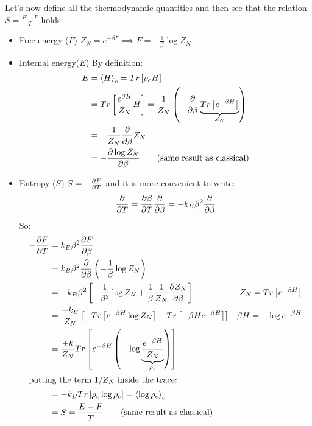 Let's now define all the thermodynamic quantities and then see that the relation $S = \frac{E-F}T$ holds:
\begin{itemize}
    \item Free energy ($F$) \qquad $ Z_N = e^{-\beta F} \implies F = -\frac1\beta \log Z_N$
    \item Internal energy($E$) \qquad By definition:
    \begin{align*}
        E &= \left<H\right>_c = Tr\left[\rho_c H\right] \\
        &= Tr\left[\frac {e^{\beta H}}{Z_N} H\right] = \frac 1{Z_N} \left(-\frac{\partial}{\partial\beta} \underbrace{Tr \left[e^{-\beta H}\right]}_{Z_N}\right) \\
        &= -\frac 1{Z_N} \frac{\partial}{\partial\beta} Z_N \\
        &= - \frac{\partial\log Z_N}{\partial\beta} \qquad \text{(same result as classical)}
    \end{align*}

    \item Entropy ($S$) \qquad $S = -\frac{\partial F}{\partial T}$ and it is more convenient to write:
    $$ \frac{\partial}{\partial T} = \frac{\partial\beta}{\partial T} \frac{\partial}{\partial\beta} = -k_B\beta^2 \frac{\partial}{\partial\beta}$$
    So:
    \begin{align*}
        -\frac{\partial F}{\partial T} &= k_B\beta^2\frac{\partial F}{\partial\beta}\\
        &= k_B \beta ^2 \frac{\partial}{\partial\beta}\left(-\frac 1{\beta}\log Z_N\right)\\
        &= -k_B \beta^2 \left[-\frac1{\beta^2} \log Z_N + \frac 1\beta \frac 1{Z_N} \frac{\partial Z_N}{\partial\beta}\right] &Z_N = Tr\left[e^{-\beta H}\right]\\
        &=\frac {-k_B}{Z_N} \left[-Tr\left[e^{-\beta H}\log Z_N\right] + Tr\left[-\beta H e^{-\beta H}\right]\right] &\beta H = -\log e^{-\beta H}\\
        &= \frac {+k}{Z_N} Tr\left[e^{-\beta H} \left(-\log \underbrace{\frac {e^{-\beta H}}{Z_N}}_{\rho_c}\right)\right]\\
        \intertext{putting the term $1/Z_N$ inside the trace:}
        &= -k_B Tr\left[\rho_c \log \rho_c\right] = \left<\log \rho_c\right>_c\\
        &=S = \frac {E-F}T \qquad \text{(same result as classical)}
    \end{align*}
\end{itemize}

